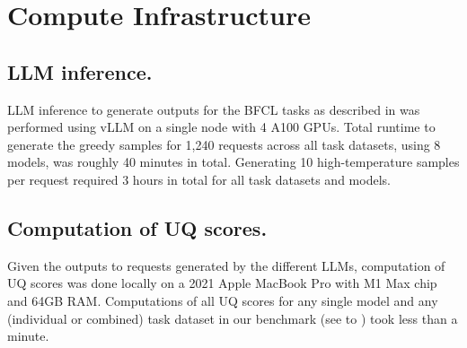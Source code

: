 \section{Compute Infrastructure}
\label{app:compute}

\subsection{LLM inference.}
LLM inference to generate outputs for the BFCL tasks as described in  was performed using vLLM on a single node with 4 A100 GPUs. Total runtime to generate the greedy samples for 1,240 requests across all task datasets, using 8 models, was roughly 40 minutes in total. Generating 10 high-temperature samples per request required 3 hours in total for all task datasets and models.    

\subsection{Computation of UQ scores.}
Given the outputs to requests generated by the different LLMs, computation of UQ scores was done locally on a 2021 Apple MacBook Pro with M1 Max chip and 64GB RAM. Computations of all UQ scores for any single model and any (individual or combined) task dataset in our benchmark (see  to ) took less than a minute. 
